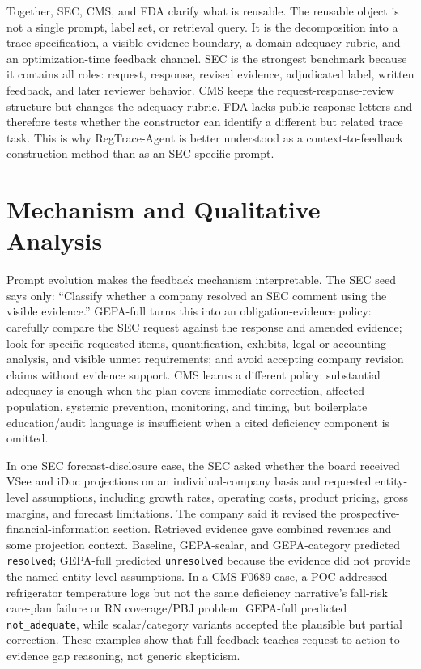 \documentclass[11pt]{article}
\newcommand{\framework}{RegTrace-Agent}
\begin{document}
Together, SEC, CMS, and FDA clarify what is reusable. The reusable object is not a single prompt, label set, or retrieval query. It is the decomposition into a trace specification, a visible-evidence boundary, a domain adequacy rubric, and an optimization-time feedback channel. SEC is the strongest benchmark because it contains all roles: request, response, revised evidence, adjudicated label, written feedback, and later reviewer behavior. CMS keeps the request-response-review structure but changes the adequacy rubric. FDA lacks public response letters and therefore tests whether the constructor can identify a different but related trace task. This is why \framework{} is better understood as a context-to-feedback construction method than as an SEC-specific prompt.

\section{Mechanism and Qualitative Analysis}
\label{sec:cases}

Prompt evolution makes the feedback mechanism interpretable. The SEC seed says only: ``Classify whether a company resolved an SEC comment using the visible evidence.'' GEPA-full turns this into an obligation-evidence policy: carefully compare the SEC request against the response and amended evidence; look for specific requested items, quantification, exhibits, legal or accounting analysis, and visible unmet requirements; and avoid accepting company revision claims without evidence support. CMS learns a different policy: substantial adequacy is enough when the plan covers immediate correction, affected population, systemic prevention, monitoring, and timing, but boilerplate education/audit language is insufficient when a cited deficiency component is omitted.

In one SEC forecast-disclosure case, the SEC asked whether the board received VSee and iDoc projections on an individual-company basis and requested entity-level assumptions, including growth rates, operating costs, product pricing, gross margins, and forecast limitations. The company said it revised the prospective-financial-information section. Retrieved evidence gave combined revenues and some projection context. Baseline, GEPA-scalar, and GEPA-category predicted \texttt{resolved}; GEPA-full predicted \texttt{unresolved} because the evidence did not provide the named entity-level assumptions. In a CMS F0689 case, a POC addressed refrigerator temperature logs but not the same deficiency narrative's fall-risk care-plan failure or RN coverage/PBJ problem. GEPA-full predicted \texttt{not\_adequate}, while scalar/category variants accepted the plausible but partial correction. These examples show that full feedback teaches request-to-action-to-evidence gap reasoning, not generic skepticism.
\end{document}
